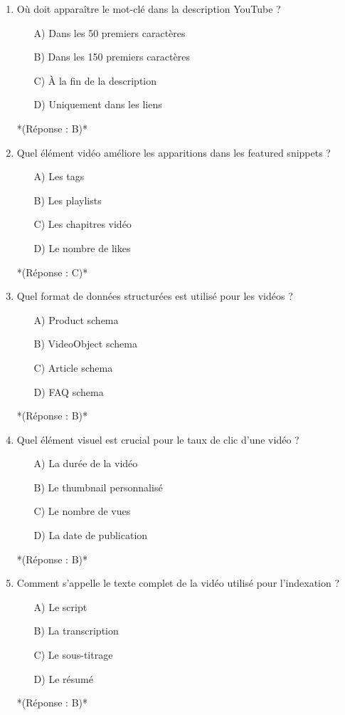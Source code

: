 \documentclass[12pt,a4paper,twoside]{report}
\begin{document}
\begin{enumerate}
    \item Où doit apparaître le mot-clé dans la description YouTube ?
    \begin{itemize}
        \item[A)] Dans les 50 premiers caractères
        \item[B)] Dans les 150 premiers caractères
        \item[C)] À la fin de la description
        \item[D)] Uniquement dans les liens
    \end{itemize}
    *(Réponse : B)*

    \item Quel élément vidéo améliore les apparitions dans les featured snippets ?
    \begin{itemize}
        \item[A)] Les tags
        \item[B)] Les playlists
        \item[C)] Les chapitres vidéo
        \item[D)] Le nombre de likes
    \end{itemize}
    *(Réponse : C)*

    \item Quel format de données structurées est utilisé pour les vidéos ?
    \begin{itemize}
        \item[A)] Product schema
        \item[B)] VideoObject schema
        \item[C)] Article schema
        \item[D)] FAQ schema
    \end{itemize}
    *(Réponse : B)*

    \item Quel élément visuel est crucial pour le taux de clic d'une vidéo ?
    \begin{itemize}
        \item[A)] La durée de la vidéo
        \item[B)] Le thumbnail personnalisé
        \item[C)] Le nombre de vues
        \item[D)] La date de publication
    \end{itemize}
    *(Réponse : B)*

    \item Comment s'appelle le texte complet de la vidéo utilisé pour l'indexation ?
    \begin{itemize}
        \item[A)] Le script
        \item[B)] La transcription
        \item[C)] Le sous-titrage
        \item[D)] Le résumé
    \end{itemize}
    *(Réponse : B)*


\end{enumerate}
\end{document}
